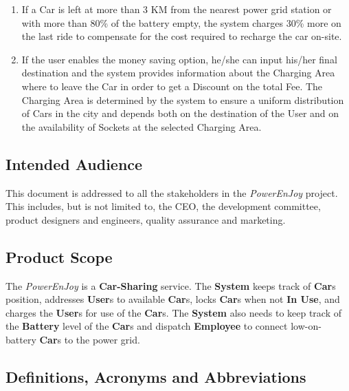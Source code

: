 \begin{enumerate}
	\item If a Car is left at more than 3 KM from the nearest power grid station or with more than 80\% of the battery empty, the system charges 30\% more on the last ride to compensate for the cost required to recharge the car on-site.
	\item If the user enables the money saving option, he/she can input his/her final destination and the system provides information about the Charging Area where to leave the Car in order to get a Discount on the total Fee. The Charging Area is determined by the system to ensure a uniform distribution of Cars in the city and depends both on the destination of the User and on the availability of Sockets at the selected Charging Area. 
\end{enumerate}


\subsection{Intended Audience}
This document is addressed to all the stakeholders in the \emph{PowerEnJoy} project. This includes, but is not limited to, the CEO, the development committee, product designers and engineers, quality assurance and marketing.

\subsection{Product Scope}
The \emph{PowerEnJoy} is a \textbf{Car-Sharing} service. 
The \textbf{System} keeps track of \textbf{Car}s position, addresses \textbf{User}s to available \textbf{Car}s, locks \textbf{Car}s when not \textbf{In Use}, and charges the \textbf{User}s for use of the \textbf{Car}s. 
The \textbf{System} also needs to keep track of the \textbf{Battery} level of the \textbf{Car}s and dispatch \textbf{Employee} to connect low-on-battery \textbf{Car}s to the power grid.

\subsection{Definitions, Acronyms and Abbreviations}
